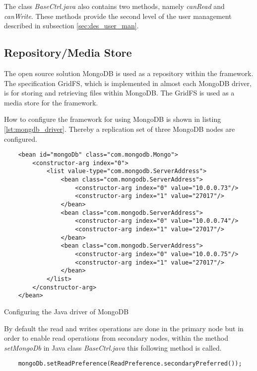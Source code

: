 The class \textit{BaseCtrl.java} also contains two methods, namely \textit{canRead} and \textit{canWrite}. These methods provide the second level of the user management described in subsection \ref{sec:des_user_man}.

\subsection{Repository/Media Store\label{sec:impl_repo}}

The open source solution MongoDB is used as a repository within the framework. The specification GridFS, which is implemented in almost each MongoDB driver, is for storing and retrieving files within MongoDB. The GridFS is used as a media store for the framework.

How to configure the framework for using MongoDB is shown in listing \ref{lst:mongdb_driver}. Thereby a replication set of three MongoDB nodes are configured. 

\begin{code}
\begin{verbatim}
    <bean id="mongoDb" class="com.mongodb.Mongo">
        <constructor-arg index="0">
            <list value-type="com.mongodb.ServerAddress">
                <bean class="com.mongodb.ServerAddress">
                    <constructor-arg index="0" value="10.0.0.73"/>
                    <constructor-arg index="1" value="27017"/>
                </bean>
                <bean class="com.mongodb.ServerAddress">
                    <constructor-arg index="0" value="10.0.0.74"/>
                    <constructor-arg index="1" value="27017"/>
                </bean>
                <bean class="com.mongodb.ServerAddress">
                    <constructor-arg index="0" value="10.0.0.75"/>
                    <constructor-arg index="1" value="27017"/>
                </bean>
            </list>
        </constructor-arg>
    </bean>
\end{verbatim}
\caption{Configuring the Java driver of MongoDB}
\label{lst:mongdb_driver}
\end{code}

By default the read and writes operations are done in the primary node but in order to enable read operations from secondary nodes, within the method \textit{setMongoDb} in Java class \textit{BaseCtrl.java} this following method is called. \textit{}
\begin{code}
\begin{verbatim}
	mongoDb.setReadPreference(ReadPreference.secondaryPreferred());
\end{verbatim}
\end{code}

